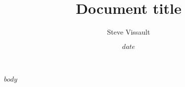 \documentclass[10pt]{article}
\title{Document title}
\author{Steve Vissault}
\date{$date$}
\begin{document}
\maketitle
\tableofcontents
$body$
\end{document}
